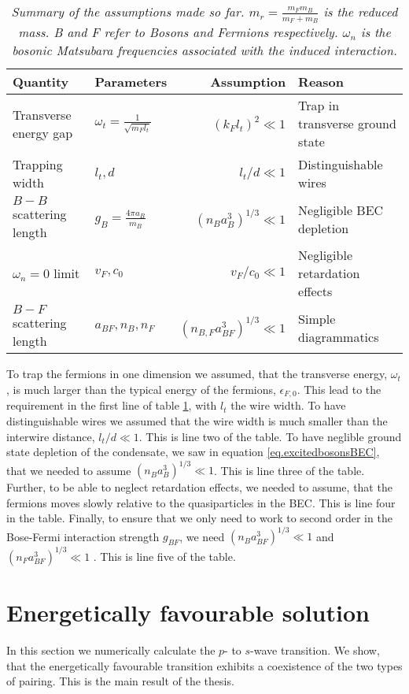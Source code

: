 \begin{table}[htb]
\def\arraystretch{1.5}
\centering
\caption{\textit{Summary of the assumptions made so far. $m_r = \frac{m_Fm_B}{m_F+m_B}$ is the reduced mass. B and F refer to Bosons and Fermions respectively. $\omega_n$ is the bosonic Matsubara frequencies associated with the induced interaction.}}
\begin{tabular}{|l|l|r|l|}
		\hline \textbf{Quantity} 		& \textbf{Parameters} 					& \textbf{Assumption}				& \textbf{Reason}	\\ \hline
		\hline Transverse energy gap 	& $\omega_t = \frac{1}{\sqrt{m_Fl_t}}$ 	& $(k_Fl_t)^2 	 	\ll 1$ 			& Trap in transverse ground state \\
		\hline Trapping width 		 	& $l_t, d$ 								& $l_t / d 	\ll 1$ 					& Distinguishable wires \\
		\hline $B-B$ scattering length 	& $g_B = \frac{4\pi a_B}{m_B}$			& $(n_Ba_B^3)^{1/3}	\ll 1$			& Negligible BEC depletion  \\
		\hline $\omega_n = 0$ limit  	& $v_F,c_0$								& $v_F/c_0 \ll 1$ 					& Negligible retardation effects  \\
		\hline $B-F$ scattering length 	& $a_{BF}, n_B, n_F$ 					& $(n_{B,F}a_{BF}^3)^{1/3}	\ll 1$ 	& Simple diagrammatics\\
		\hline 
\end{tabular}
\label{tab.assumptions}
\end{table} 

To trap the fermions in one dimension we assumed, that the transverse energy, $\omega_t$, is much larger than the typical energy of the fermions, $\epsilon_{F,0}$. This lead to the requirement in the first line of table \ref{tab.assumptions}, with $l_t$ the wire width. To have distinguishable wires we assumed that the wire width is much smaller than the interwire distance, $l_t / d \ll 1$. This is line two of the table. To have neglible ground state depletion of the condensate, we saw in equation \eqref{eq.excitedbosonsBEC}, that we needed to assume $(n_Ba_B^3)^{1/3}\ll 1$. This is line three of the table. Further, to be able to neglect retardation effects, we needed to assume, that the fermions moves slowly relative to the quasiparticles in the BEC. This is line four in the table. Finally, to ensure that we only need to work to second order in the Bose-Fermi interaction strength $g_{BF}$, we need $(n_Ba_{BF}^3)^{1/3} \ll 1$ and $(n_Fa_{BF}^3)^{1/3} \ll 1$ . This is line five of the table. 


\section{Energetically favourable solution}
\label{sec.2wiresCrossover_energy}
In this section we numerically calculate the $p$- to $s$-wave transition. We show, that the energetically favourable transition exhibits a coexistence of the two types of pairing. This is the main result of the thesis. 

